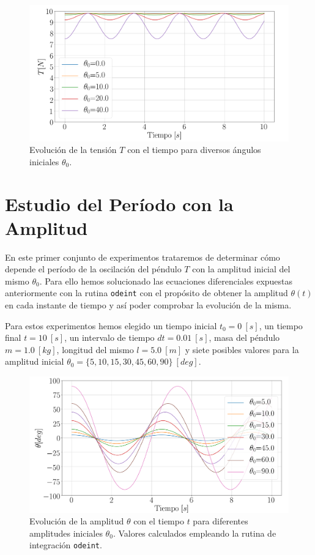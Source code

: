 \documentclass[journal]{IEEEtran}
\begin{document}
\begin{figure}[!htb]
  \centering
  \includegraphics[width=\linewidth]{tension}
  \caption{Evolución de la tensión $T$ con el tiempo para diversos ángulos iniciales $\theta_0$.}
  \label{fig:tension}
\end{figure}

\section{Estudio del Período con la Amplitud}

En este primer conjunto de experimentos trataremos de determinar cómo depende el período de la oscilación del péndulo $T$ con la amplitud inicial del mismo $\theta_0$. Para ello hemos solucionado las ecuaciones diferenciales expuestas anteriormente con la rutina \texttt{odeint} con el propósito de obtener la amplitud $\theta(t)$ en cada instante de tiempo y así poder comprobar la evolución de la misma.

Para estos experimentos hemos elegido un tiempo inicial $t_0 = 0~[s]$, un tiempo final $t = 10~[s]$, un intervalo de tiempo $dt = 0.01~[s]$, masa del péndulo $m = 1.0~[kg]$, longitud del mismo $l = 5.0~[m]$ y siete posibles valores para la amplitud inicial $\theta_0 = \{5, 10, 15, 30, 45, 60, 90\}~[deg]$.

\begin{figure}[!htb]
  \centering
  \includegraphics[width=\linewidth]{theta0}
  \caption{Evolución de la amplitud $\theta$ con el tiempo $t$ para diferentes amplitudes iniciales $\theta_0$. Valores calculados empleando la rutina de integración \texttt{odeint}.}
  \label{fig:theta0}
\end{figure}
\end{document}
